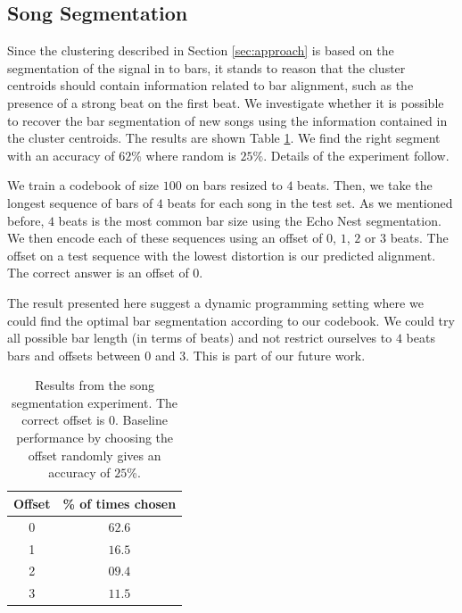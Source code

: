 \documentclass{article}
\begin{document}

\subsection{Song Segmentation} \label{ssec:segment}

Since the clustering described in Section \ref{sec:approach} is based
on the segmentation of the signal in to bars, it stands to reason that
the cluster centroids should contain information related to bar
alignment, such as the presence of a strong beat on the first beat.
%
We investigate whether it is possible to recover the
bar segmentation of new songs using the information contained in the
cluster centroids.  The results are shown Table \ref{tab:offset}. We find
the right segment with an accuracy of $62\%$ where random is
$25\%$. Details of the experiment follow.

We train a codebook of size $100$ on bars resized to $4$ beats. Then,
we take the longest sequence of bars of $4$ beats for each song
in the test set.  As
we mentioned before, $4$ beats is the most common bar size using the
Echo Nest segmentation. We then encode each of these sequences using an offset
of $0$, $1$, $2$ or $3$ beats. The offset on a test sequence
with the lowest distortion is our predicted alignment.
The correct answer is an offset of $0$.


The result presented here suggest a dynamic programming setting where
we could find the optimal bar segmentation according to our codebook. 
We could try
all possible bar length (in terms of beats) and not restrict ourselves
to $4$ beats bars and offsets between $0$ and $3$. This is part of
our future work.

\begin{table}
\begin{center}
\begin{tabular}{cc}
\toprule
Offset & \% of times chosen \\
\midrule
0 & $\mathbf{62.6}$\\
1 & $16.5$\\
2 & $09.4$\\
3 & $11.5$\\
\bottomrule
\end{tabular}
\end{center}
\caption{\small{
Results from the song segmentation experiment.
The correct offset is $0$.
Baseline performance by choosing the offset randomly gives an accuracy of $25$\%.
}}
\label{tab:offset}
\end{table}
\end{document}
